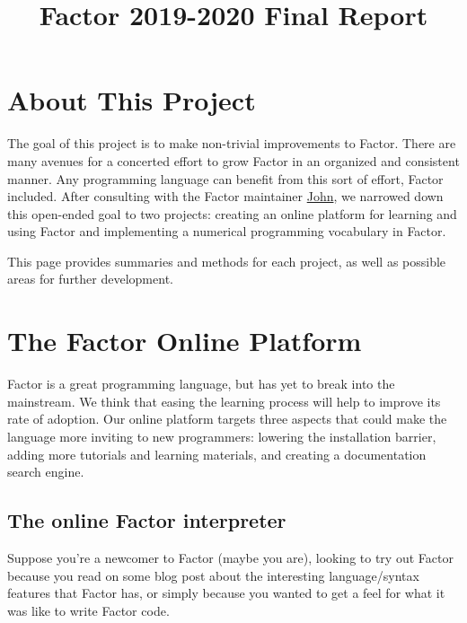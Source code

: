 \documentclass[
]{article}
\title{Factor 2019-2020 Final Report}
\author{}
\date{}
\begin{document}
\maketitle

\hypertarget{about-this-project}{%
\section{About This Project}\label{about-this-project}}

The goal of this project is to make non-trivial improvements to Factor.
There are many avenues for a concerted effort to grow Factor in an
organized and consistent manner. Any programming language can benefit
from this sort of effort, Factor included. After consulting with the
Factor maintainer \href{https://re-factor.blogspot.com/}{John}, we
narrowed down this open-ended goal to two projects: creating an online
platform for learning and using Factor and implementing a numerical
programming vocabulary in Factor.

This page provides summaries and methods for each project, as well as
possible areas for further development.

\hypertarget{the-factor-online-platform}{%
\section{The Factor Online Platform}\label{the-factor-online-platform}}

Factor is a great programming language, but has yet to break into the
mainstream. We think that easing the learning process will help to
improve its rate of adoption. Our online platform targets three aspects
that could make the language more inviting to new programmers: lowering
the installation barrier, adding more tutorials and learning materials,
and creating a documentation search engine.

\hypertarget{the-online-factor-interpreter}{%
\subsection{The online Factor
interpreter}\label{the-online-factor-interpreter}}

Suppose you're a newcomer to Factor (maybe you are), looking to try out
Factor because you read on some blog post about the interesting
language/syntax features that Factor has, or simply because you wanted
to get a feel for what it was like to write Factor code.
\end{document}
